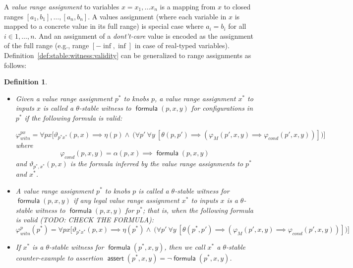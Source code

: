 \documentclass[a4paper,parskip=half]{article} %
\newcommand*\eqdef=
\newcommand*\assert{\operatorname{\mathsf{assert}}}
\newcommand*\formula{\operatorname{\mathsf{formula}}}
\newtheorem{defn}[thm]{Definition}
\begin{document}
A \emph{value range assignment} to variables $x = x_1,\ldots x_n$ is a mapping from $x$ to closed ranges $[a_1, b_1], \ldots, [a_n, b_n]$.
A values assignment (where each variable in $x$ is mapped to a concrete value in its full range) is special case where 
$a_i = b_i$ for all $i \in 1,\ldots, n$. And an assignment  of a \emph{dont't-care} value is encoded as the assignment 
of the full range (e.g., range $[-\inf, \inf]$ in case of real-typed variables).  
Definition~\ref{def:stable:witness:validity} can be generalized to range assignments as follows:

\begin{defn}\label{def:stable:witness:validity:ranges}
\begin{itemize}
\item
Given a value range assignment $p^*$ to knobs $p$, a value range assignment $x^*$ to inputs $x$ is called a \emph{$\theta$-stable witness}
to $\formula(p,x,y)$ for configurations in $p^*$ if the following formula is valid:

\begin{equation}\label{form:gear:certify:knobs:inputs:ranges}
\varphi_{\mathit{witn}}^{px} \eqdef
    \forall px \big[ \vartheta_{p^*x^*}(p,x) \implies
     \eta(p) \wedge ~\big(
    \forall p'~
    \forall y~[ \theta(p, p') \implies (\varphi_M(p',x,y)  \implies  \varphi_{\mathit{cond}}(p',x,y)) ]
   \big)  \big]
\end{equation}
where \[\varphi_{\mathit{cond}}(p,x,y) \eqdef \alpha(p,x) \implies \formula(p,x,y)\]
\noindent and $\vartheta_{p^*,x^*}(p,x)$ is the formula inferred by the value range assignments 
to $p^*$ and $x^*$.

\item
A value range assignment $p^*$ to knobs $p$ is called a  \emph{$\theta$-stable witness for $\formula(p,x,y)$} if any legal value range assignment 
$x^*$ to inputs $x$ is a $\theta$-stable witness to $\formula(p,x,y)$ for $p^*$; that is, when the following formula is valid (TODO: CHECK THE FORMULA):
\begin{equation}\label{form:gear:certify:knobs:ranges}
\varphi_{\mathit{witn}}^{p}(p^*) \eqdef
  \forall px \big[ \vartheta_{p^*x^*}(p,x) \implies
     \eta(p^*) \wedge ~\big(
    \forall p'~
    \forall y~[
   \theta(p^*, p') \implies (\varphi_M(p',x,y)  \implies  \varphi_{\mathit{cond}}(p',x,y))
    ]\big)  \big]
\end{equation}
\item 
If $x^*$ is a  $\theta$-stable witness for $\formula(p^*, x,y)$, then we call $x^*$  a \emph{$\theta$-stable counter-example to  
assertion $\assert(p^*, x,y)  \eqdef \neg \formula(p^*, x,y)$}.
\end{itemize}
\end{defn}
\end{document}

